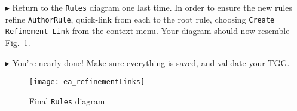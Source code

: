 \begin{itemize}
\item[$\blacktriangleright$] Return to the \texttt{Rules} diagram one last time. In order to ensure the new rules refine \texttt{AuthorRule},
quick-link from each to the root rule, choosing \texttt{Create Refinement Link} from the context menu. Your diagram should now resemble
Fig.~\ref{ea:refinementClasses}.

\item[$\blacktriangleright$] You're nearly done! Make sure everything is saved, and validate your TGG. 

\newpage

\vspace*{3cm}

\begin{figure}[htbp]
\begin{center}
  \texttt{[image: ea\_refinementLinks]}
  \caption{Final \texttt{Rules} diagram}
  \label{ea:refinementClasses}
\end{center}
\end{figure}








\end{itemize}
